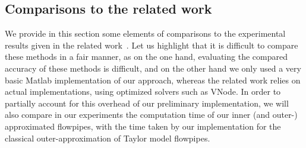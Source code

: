 

\subsection{Comparisons to the related work}
\label{sec:exp_compar}
We provide in this section some elements of comparisons to the experimental results given in the related work~\cite{Underapproxflowpipes,underapprox16}.
Let us highlight that it is difficult to compare these methods in a fair manner, as on the one hand, evaluating the compared accuracy of these methods is difficult, 
and on the other hand we only used a very basic Matlab implementation of our approach, whereas the related work relies on actual implementations,
using optimized solvers such as VNode. In order to partially account for this overhead of our preliminary implementation, we will also compare in our experiments 
the computation time of our inner (and outer-) approximated flowpipes, with the time taken by our implementation for the classical outer-approximation 
of Taylor model flowpipes. 


